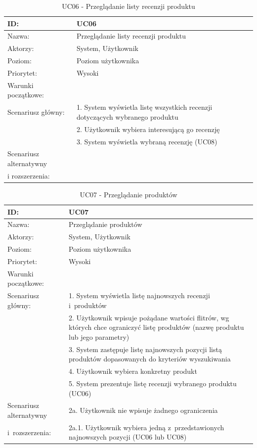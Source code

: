 \begin{table}[H]
    \begin{tabular}{|p{5cm}|p{9cm}|}\hline
    ID: & UC06 \\\hline
    Nazwa: & Przeglądanie listy recenzji produktu \\\hline
    Aktorzy: & System, Użytkownik \\\hline
    Poziom: & Poziom użytkownika  \\\hline
    Priorytet: & Wysoki \\\hline
    Warunki początkowe: & ~ \\\hline
    Scenariusz główny: & 1. System wyświetla listę wszystkich recenzji dotyczących wybranego produktu \\
    ~ & 2. Użytkownik wybiera interesującą go recenzję \\
    ~ & 3. System wyświetla wybraną recenzję (UC08) \\\hline
    Scenariusz alternatywny & ~ \\
	i rozszerzenia: & ~ \\
    \hline\end{tabular}
	\caption{UC06 - Przeglądanie listy recenzji produktu}
\end{table}
\newpage
\begin{table}[H]
    \begin{tabular}{|p{5cm}|p{9cm}|}\hline
    ID: & UC07 \\\hline
    Nazwa: & Przeglądanie produktów \\\hline
    Aktorzy: & System, Użytkownik \\\hline
    Poziom: & Poziom użytkownika  \\\hline
    Priorytet: & Wysoki \\\hline
    Warunki początkowe: & ~ \\\hline
    Scenariusz główny: & 1. System wyświetla listę najnowszych recenzji i~produktów \\
    ~ & 2. Użytkownik wpisuje pożądane wartości flitrów, wg których chce ograniczyć listę produktów (nazwę produktu lub jego parametry) \\
    ~ & 3. System zastępuje listę najnowszych pozycji listą produktów dopasowanych do kryteriów wyszukiwania \\
    ~ & 4. Użytkownik wybiera konkretny produkt \\
    ~ & 5. System prezentuje listę recenzji wybranego produktu (UC06) \\\hline
    Scenariusz alternatywny & 2a. Użytkownik nie wpisuje żadnego ograniczenia \\
    i~rozszerzenia: & 2a.1. Użytkownik wybiera jedną z~przedstawionych najnowszych pozycji (UC06 lub UC08) \\
	\hline\end{tabular}
	\caption{UC07 - Przeglądanie produktów}
\end{table}

